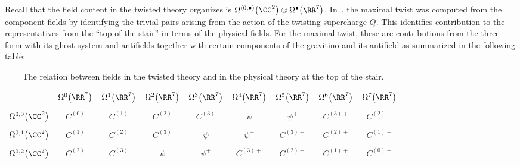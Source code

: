 \documentclass[10pt,a4paper]{amsart}
\numberwithin{equation}{section}
\theoremstyle{definition}
\begin{document}
Recall that the field content in the twisted theory organizes is $\Omega^{(0,\bullet)}\big(\CC^2\big) \otimes \Omega^\bullet\big(\RR^7\big)$. In~\cite{MaxTwist}, the maximal twist was computed from the component fields by identifying the trivial pairs arising from the action of the twisting supercharge $Q$. This identifies contribution to the representatives from the ``top of the stair'' in terms of the physical fields. For the maximal twist, these are contributions from the three-form with its ghost system and antifields together with certain components of the gravitino and its antifield as summarized in the following table:
\begin{table}[htp]
	\small
	\begin{center}
		\begin{tabular}{c|cccccccc}
			& $\Omega^0\big(\RR^7\big)$ & $\Omega^1\big(\RR^7\big)$ & $\Omega^2\big(\RR^7\big)$ & $\Omega^3\big(\RR^7\big)$ &
			$\Omega^4\big(\RR^7\big)$ & $\Omega^5\big(\RR^7\big)$ & $\Omega^6\big(\RR^7\big)$ & $\Omega^7\big(\RR^7\big)$ \\
			\hline
			\\[-0.3cm]
			$\Omega^{0,0}\big(\CC^2\big)$ & $C^{(0)}$ & $C^{(1)}$ & $C^{(2)}$ & $C^{(3)}$ & $\psi$ &
			$\psi^{+}$ & $C^{(3)+}$ & $C^{(2)+}$ \\ \\[-0.3cm]
			$\Omega^{0,1}\big(\CC^2\big)$ & $C^{(1)}$ & $C^{(2)}$ & $C^{(3)}$ & $\psi$ &
			$\psi^{+}$ & $C^{(3)+}$ & $C^{(2)+}$ & $C^{(1)+}$ \\ \\[-0.3cm]
			$\Omega^{0,2}\big(\CC^2\big)$ & $C^{(2)}$ & $C^{(3)}$ & $\psi$ & $\psi^{+}$ &
			$C^{(3)+}$ & $C^{(2)+}$ & $C^{(1)+}$ & $C^{(0)+}$ \\
		\end{tabular}
	\end{center}
	\caption{The relation between fields in the twisted theory and in the physical theory at the top of the stair.} \label{tab:twistedfields}
\end{table}
\end{document}
